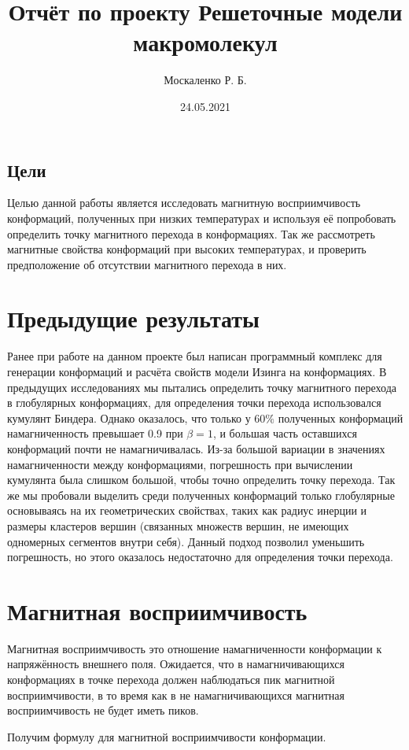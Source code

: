 \documentclass[a4paper,12pt]{article}
\title{Отчёт по проекту Решеточные модели макромолекул}
\author{Москаленко Р. Б.}
\date{24.05.2021}
\begin{document}





\subsection{Цели}
Целью данной работы является исследовать магнитную восприимчивость конформаций, полученных при низких температурах и используя её попробовать определить точку магнитного перехода в конформациях. Так же рассмотреть магнитные свойства конформаций при высоких температурах, и проверить предположение об отсутствии магнитного перехода в них.

\section{Предыдущие результаты}

Ранее при работе на данном проекте был написан программный комплекс для генерации конформаций и расчёта свойств модели Изинга на конформациях. В предыдущих исследованиях мы пытались определить точку магнитного перехода в глобулярных конформациях, для определения точки перехода использовался кумулянт Биндера. Однако оказалось, что только у $60\%$ полученных конформаций намагниченность превышает 0.9 при $\beta = 1$, и большая часть оставшихся конформаций почти не намагничивалась. Из-за большой вариации в значениях намагниченности между конформациями, погрешность при вычислении кумулянта была слишком большой, чтобы точно определить точку перехода. Так же мы пробовали выделить среди полученных конформаций только глобулярные основываясь на их геометрических свойствах, таких как радиус инерции и размеры кластеров вершин (связанных множеств вершин, не имеющих одномерных сегментов внутри себя). Данный подход позволил уменьшить погрешность, но этого оказалось недостаточно для определения точки перехода.

\section{Магнитная восприимчивость} 
Магнитная восприимчивость это отношение намагниченности конформации к напряжённость внешнего поля. Ожидается, что в намагничивающихся конформациях в точке перехода должен наблюдаться пик магнитной восприимчивости, в то время как в не намагничивающихся магнитная восприимчивость не будет иметь пиков.

Получим формулу для магнитной восприимчивости конформации.
\end{document}
